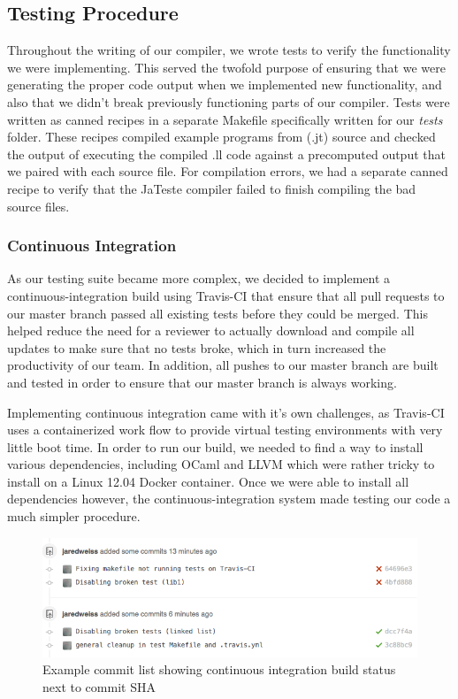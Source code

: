 \documentclass{article}
\begin{document}
\subsection{Testing Procedure}
Throughout the writing of our compiler, we wrote tests to verify the functionality we were implementing. This served the twofold purpose of ensuring that we were generating the proper code output when we implemented new functionality, and also that we didn't break previously functioning parts of our compiler. Tests were written as canned recipes in a separate Makefile specifically written for our \textit{tests} folder. These recipes compiled example programs from (.jt) source and checked the output of executing the compiled .ll code against a precomputed output that we paired with each source file. For compilation errors, we had a separate canned recipe to verify that the JaTeste compiler failed to finish compiling the bad source files.   

\subsubsection{Continuous Integration}
As our testing suite became more complex, we decided to implement a continuous-integration build using Travis-CI that ensure that all pull requests to our master branch passed all existing tests before they could be merged. This helped reduce the need for a reviewer to actually download and compile all updates to make sure that no tests broke, which in turn increased the productivity of our team. In addition, all pushes to our master branch are built and tested in order to ensure that our master branch is always working.

Implementing continuous integration came with it's own challenges, as Travis-CI uses a containerized work flow to provide virtual testing environments with very little boot time. In order to run our build, we needed to find a way to install various dependencies, including OCaml and LLVM which were rather tricky to install on a Linux 12.04 Docker container. Once we were able to install all dependencies however, the continuous-integration system made testing our code a much simpler procedure. 

\begin{figure}[h]
    \centering
    \includegraphics[width=.9\textwidth]{travis_ci_on_commits.png}
    \caption{Example commit list showing continuous integration build status next to commit SHA}
\end{figure}
\end{document}
